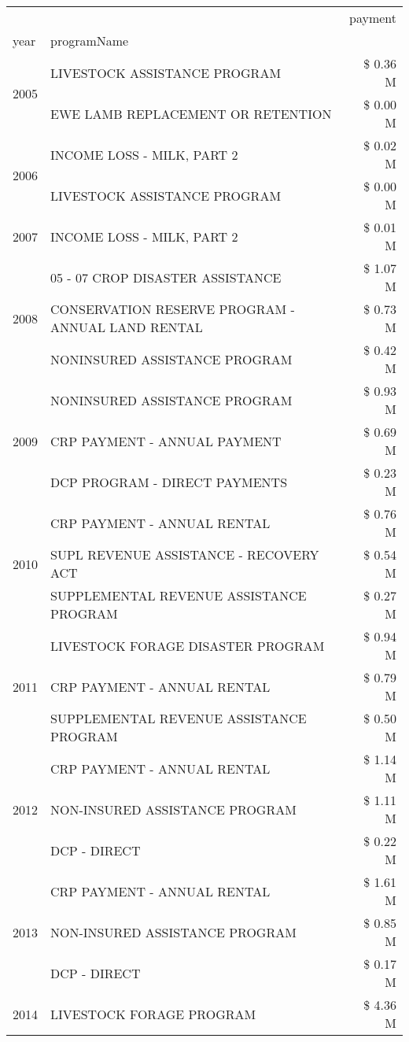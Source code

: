 \begin{tabular}{llr}
\toprule
 &  & payment \\
year & programName &  \\
\midrule
\multirow[t]{2}{*}{2005} & LIVESTOCK ASSISTANCE PROGRAM & \$ 0.36 M \\
 & EWE LAMB REPLACEMENT OR RETENTION & \$ 0.00 M \\
\cline{1-3}
\multirow[t]{2}{*}{2006} & INCOME LOSS - MILK, PART 2 & \$ 0.02 M \\
 & LIVESTOCK ASSISTANCE PROGRAM & \$ 0.00 M \\
\cline{1-3}
2007 & INCOME LOSS - MILK, PART 2 & \$ 0.01 M \\
\cline{1-3}
\multirow[t]{3}{*}{2008} & 05 - 07 CROP DISASTER ASSISTANCE & \$ 1.07 M \\
 & CONSERVATION RESERVE PROGRAM - ANNUAL LAND RENTAL & \$ 0.73 M \\
 & NONINSURED ASSISTANCE PROGRAM & \$ 0.42 M \\
\cline{1-3}
\multirow[t]{3}{*}{2009} & NONINSURED ASSISTANCE PROGRAM & \$ 0.93 M \\
 & CRP PAYMENT - ANNUAL PAYMENT & \$ 0.69 M \\
 & DCP PROGRAM - DIRECT PAYMENTS & \$ 0.23 M \\
\cline{1-3}
\multirow[t]{3}{*}{2010} & CRP PAYMENT - ANNUAL RENTAL & \$ 0.76 M \\
 & SUPL REVENUE ASSISTANCE - RECOVERY ACT & \$ 0.54 M \\
 & SUPPLEMENTAL REVENUE ASSISTANCE PROGRAM & \$ 0.27 M \\
\cline{1-3}
\multirow[t]{3}{*}{2011} & LIVESTOCK FORAGE DISASTER PROGRAM & \$ 0.94 M \\
 & CRP PAYMENT - ANNUAL RENTAL & \$ 0.79 M \\
 & SUPPLEMENTAL REVENUE ASSISTANCE PROGRAM & \$ 0.50 M \\
\cline{1-3}
\multirow[t]{3}{*}{2012} & CRP PAYMENT - ANNUAL RENTAL & \$ 1.14 M \\
 & NON-INSURED ASSISTANCE PROGRAM & \$ 1.11 M \\
 & DCP - DIRECT & \$ 0.22 M \\
\cline{1-3}
\multirow[t]{3}{*}{2013} & CRP PAYMENT - ANNUAL RENTAL & \$ 1.61 M \\
 & NON-INSURED ASSISTANCE PROGRAM & \$ 0.85 M \\
 & DCP - DIRECT & \$ 0.17 M \\
\cline{1-3}
\multirow[t]{3}{*}{2014} & LIVESTOCK FORAGE PROGRAM & \$ 4.36 M \\

\end{tabular}
